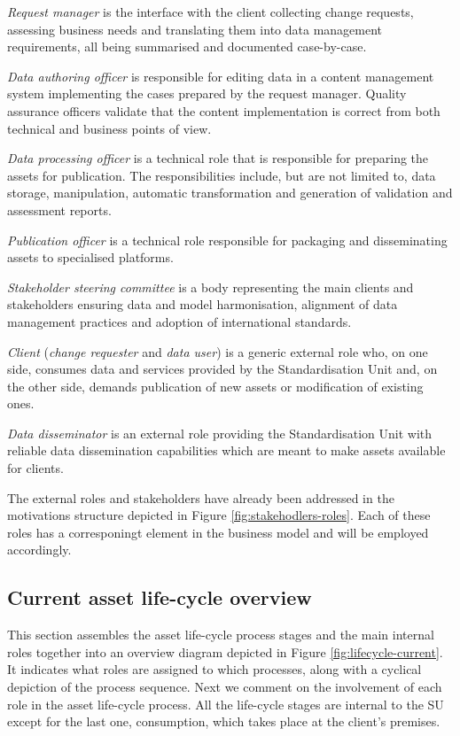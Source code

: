 	\textit{Request manager} is the interface with the client collecting change requests, assessing business needs and translating them into data management requirements, all being summarised and documented case-by-case. 
	
	\textit{Data authoring officer} is responsible for editing data in a content management system implementing the cases prepared by the request manager.
	Quality assurance officers validate that the content implementation is correct from both technical and business points of view. 
	
	\textit{Data processing officer} is a technical role that is responsible for preparing the assets for publication. The responsibilities include, but are not limited to, data storage, manipulation, automatic transformation and generation of validation and assessment reports. 
	
	\textit{Publication officer} is a technical role responsible for packaging and disseminating assets to specialised platforms.
	
	\textit{Stakeholder steering committee} is a body representing the main clients and stakeholders ensuring data and model harmonisation, alignment of data management practices and adoption of international standards.
	
	\textit{Client} (\textit{change requester} and \textit{data user}) is a generic external role who, on one side, consumes data and services provided by the Standardisation Unit and, on the other side, demands publication of new assets or modification of existing ones. 
	
	\textit{Data disseminator} is an external role providing the Standardisation Unit with reliable data dissemination capabilities which are meant to make assets available for clients.

	The external roles and stakeholders have already been addressed in the motivations structure depicted in Figure \ref{fig:stakehodlers-roles}. Each of these roles has a corresponingt element in the business model and will be employed accordingly.

	\subsection{Current asset life-cycle overview}
	\label{sec:lifecycle-current}
	
	This section assembles the asset life-cycle process stages and the main internal roles together into an overview diagram depicted in Figure \ref{fig:lifecycle-current}. It indicates what roles are assigned to which processes, along with a cyclical depiction of the process sequence. Next we comment on the involvement of each role in the asset life-cycle process. All the life-cycle stages are internal to the SU except for the last one, consumption, which takes place at the client's premises.
	
